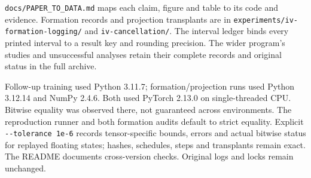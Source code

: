 \texttt{docs/PAPER\_TO\_DATA.md} maps each claim, figure and table to its code and evidence. Formation records and projection transplants are in \texttt{experiments/iv-formation-logging/} and \texttt{iv-cancellation/}. The interval ledger binds every printed interval to a result key and rounding precision. The wider program's studies and unsuccessful analyses retain their complete records and original status in the full archive.

Follow-up training used Python 3.11.7; formation/projection runs used Python 3.12.14 and NumPy 2.4.6. Both used PyTorch 2.13.0 on single-threaded CPU. Bitwise equality was observed there, not guaranteed across environments. The reproduction runner and both formation audits default to strict equality. Explicit \texttt{-{}-tolerance 1e-6} records tensor-specific bounds, errors and actual bitwise status for replayed floating states; hashes, schedules, steps and transplants remain exact. The README documents cross-version checks. Original logs and locks remain unchanged.

